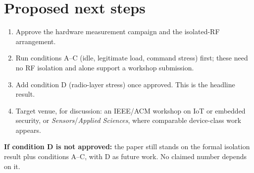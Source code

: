 \documentclass[10pt]{article}
\begin{document}
\section{Proposed next steps}
\begin{enumerate}[leftmargin=1.4em,itemsep=0.15em,topsep=0.2em]
\item Approve the hardware measurement campaign and the isolated-RF arrangement.
\item Run conditions A--C (idle, legitimate load, command stress) first; these need no RF isolation
and alone support a workshop submission.
\item Add condition D (radio-layer stress) once approved. This is the headline result.
\item Target venue, for discussion: an IEEE/ACM workshop on IoT or embedded security, or
\emph{Sensors}/\emph{Applied Sciences}, where comparable device-class work appears.
\end{enumerate}
\textbf{If condition D is not approved:} the paper still stands on the formal isolation result plus
conditions A--C, with D as future work. No claimed number depends on it.
\end{document}
